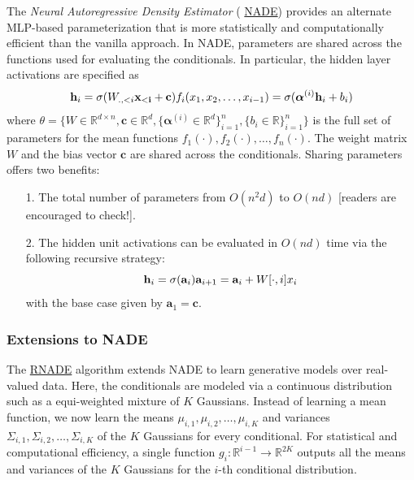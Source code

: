The {\em Neural Autoregressive Density Estimator} (
\href{http://proceedings.mlr.press/v15/larochelle11a/larochelle11a.pdf}{NADE}) provides 
an alternate MLP-based parameterization that is more statistically and computationally 
efficient than the vanilla approach. In NADE, parameters are shared across the functions 
used for evaluating the conditionals. In particular, the hidden layer activations are 
specified as
$$
\mathbf{h}_i = \sigma(W_{., <i} \mathbf{x_{<i}} + \mathbf{c})\\
f_i(x_1, x_2, \ldots, x_{i-1}) =\sigma(\boldsymbol{\alpha}^{(i)}\mathbf{h}_i +b_i )  
$$
where $\theta=\{W\in \mathbb{R}^{d\times n}, \mathbf{c} \in \mathbb{R}^d, \{\boldsymbol{
\alpha}^{(i)}\in \mathbb{R}^d\}^n_{i=1}, \{b_i \in \mathbb{R}\}^n_{i=1}\}$ is the full set 
of parameters for the mean functions $f_1(\cdot), f_2(\cdot), \ldots, f_n(\cdot)$. The 
weight matrix $W$ and the bias vector $\mathbf{c}$ are shared across the conditionals. 
Sharing parameters offers two benefits:
\begin{enumerate}
\item[1.] 
The total number of parameters from $O(n^2 d)$ to $O(nd)$ [readers are encouraged 
to check!].

\item[2.] 
The hidden unit activations can be evaluated in $O(nd)$ time via the following 
recursive strategy:
$$
\mathbf{h}_i = \sigma(\mathbf{a}_i)\\
\mathbf{a}_{i+1} = \mathbf{a}_{i} + W[\cdot, i]x_i
$$
with the base case given by $\mathbf{a}_1=\mathbf{c}$.
\end{enumerate}


\subsubsection{Extensions to NADE}

The \href{https://arxiv.org/abs/1306.0186}{RNADE} algorithm extends NADE to learn 
generative models over real-valued data. Here, the conditionals are modeled via a 
continuous distribution such as a equi-weighted mixture of $K$ Gaussians. Instead 
of learning a mean function, we now learn the means $\mu_{i,1}, \mu_{i,2},\ldots, 
\mu_{i,K}$ and variances $\Sigma_{i,1}, \Sigma_{i,2},\ldots, \Sigma_{i,K}$ of the 
$K$ Gaussians for every conditional. For statistical and computational efficiency, 
a single function $g_i: \mathbb{R}^{i-1}\rightarrow\mathbb{R}^{2K}$ outputs all 
the means and variances of the $K$ Gaussians for the $i$-th conditional distribution.

